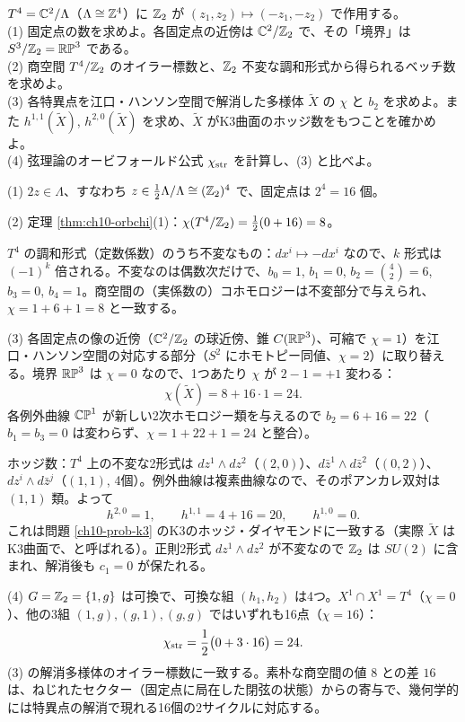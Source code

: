 \begin{problem}[難易度 C]\label{ch10-prob-t4}
$T^4=\mathbb{C}^2/\Lambda$（$\Lambda\cong\mathbb{Z}^4$）に $\mathbb{Z}_2$ が $(z_1,z_2)\mapsto(-z_1,-z_2)$ で作用する。\\
(1) 固定点の数を求めよ。各固定点の近傍は $\mathbb{C}^2/\mathbb{Z}_2$ で、その「境界」は $S^3/\mathbb{Z}_2=\mathbb{RP}^3$ である。\\
(2) 商空間 $T^4/\mathbb{Z}_2$ のオイラー標数と、$\mathbb{Z}_2$ 不変な調和形式から得られるベッチ数を求めよ。\\
(3) 各特異点を江口・ハンソン空間で解消した多様体 $\widetilde X$ の $\chi$ と $b_2$ を求めよ。また $h^{1,1}(\widetilde X)$, $h^{2,0}(\widetilde X)$ を求め、$\widetilde X$ がK3曲面のホッジ数をもつことを確かめよ。\\
(4) 弦理論のオービフォールド公式 $\chi_{\rm str}$ を計算し、(3) と比べよ。
\end{problem}

\begin{solution}
(1) $2z\in\Lambda$、すなわち $z\in\frac12\Lambda/\Lambda\cong(\mathbb{Z}_2)^4$ で、固定点は $2^4=16$ 個。

(2) 定理 \ref{thm:ch10-orbchi}(1)：$\chi(T^4/\mathbb{Z}_2)=\frac12(0+16)=8$。

$T^4$ の調和形式（定数係数）のうち不変なもの：$dx^i\mapsto-dx^i$ なので、$k$ 形式は $(-1)^k$ 倍される。不変なのは偶数次だけで、$b_0=1$, $b_1=0$, $b_2=\binom42=6$, $b_3=0$, $b_4=1$。商空間の（実係数の）コホモロジーは不変部分で与えられ、$\chi=1+6+1=8$ と一致する。

(3) 各固定点の像の近傍（$\mathbb{C}^2/\mathbb{Z}_2$ の球近傍、錐 $C(\mathbb{RP}^3)$、可縮で $\chi=1$）を江口・ハンソン空間の対応する部分（$S^2$ にホモトピー同値、$\chi=2$）に取り替える。境界 $\mathbb{RP}^3$ は $\chi=0$ なので、1つあたり $\chi$ が $2-1=+1$ 変わる：
\[
\chi(\widetilde X)=8+16\cdot1=24 .
\]
各例外曲線 $\mathbb{CP}^1$ が新しい2次ホモロジー類を与えるので $b_2=6+16=22$（$b_1=b_3=0$ は変わらず、$\chi=1+22+1=24$ と整合）。

ホッジ数：$T^4$ 上の不変な2形式は $dz^1\wedge dz^2$（$(2,0)$）、$d\bar z^1\wedge d\bar z^2$（$(0,2)$）、$dz^i\wedge d\bar z^j$（$(1,1)$, 4個）。例外曲線は複素曲線なので、そのポアンカレ双対は $(1,1)$ 類。よって
\[
h^{2,0}=1,\qquad h^{1,1}=4+16=20,\qquad h^{1,0}=0 .
\]
これは問題 \ref{ch10-prob-k3} のK3のホッジ・ダイヤモンドに一致する（実際 $\widetilde X$ はK3曲面で、と呼ばれる）。正則2形式 $dz^1\wedge dz^2$ が不変なので $\mathbb{Z}_2$ は $SU(2)$ に含まれ、解消後も $c_1=0$ が保たれる。

(4) $G=\mathbb{Z}_2=\{1,g\}$ は可換で、可換な組 $(h_1,h_2)$ は4つ。$X^1\cap X^1=T^4$（$\chi=0$）、他の3組 $(1,g),(g,1),(g,g)$ ではいずれも16点（$\chi=16$）：
\[
\chi_{\rm str}=\frac12\bigl(0+3\cdot16\bigr)=24 .
\]
(3) の解消多様体のオイラー標数に一致する。素朴な商空間の値 $8$ との差 $16$ は、ねじれたセクター（固定点に局在した閉弦の状態）からの寄与で、幾何学的には特異点の解消で現れる16個の2サイクルに対応する。
\end{solution}

